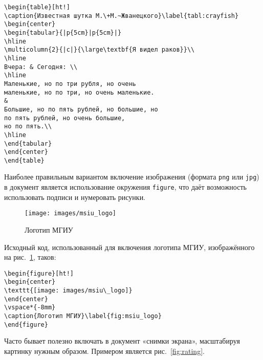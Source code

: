 \begin{small}
\begin{verbatim}
\begin{table}[ht!]
\caption{Известная шутка М.\+М.~Жванецкого}\label{tabl:crayfish}
\begin{center}
\begin{tabular}{|p{5cm}|p{5cm}|}
\hline
\multicolumn{2}{|c|}{\large\textbf{Я видел раков}}\\
\hline
Вчера: & Сегодня: \\
\hline
Маленькие, но по три рубля, но очень
маленькие, но по три, но очень маленькие.
&
Большие, но по пять рублей, но большие, но
по пять рублей, но очень большие,
но по пять.\\
\hline
\end{tabular}
\end{center}
\end{table}
\end{verbatim}
\end{small}

Наиболее правильным вариантом включение изображения (формата \verb|png| или
\verb|jpg|)
в документ является использование окружения \verb|figure|, что
даёт возможность использовать подписи и нумеровать рисунки.

\begin{figure}[ht!]
\begin{center}
\texttt{[image: images/msiu\_logo]}
\end{center}
\vspace*{-8mm}
\caption{Логотип МГИУ}\label{fig:msiu_logo}
\end{figure}

\newpage

Исходный код, использованный для включения логотипа МГИУ,
изображённого на рис.~\ref{fig:msiu_logo}, таков:

\begin{small}
\begin{verbatim}
\begin{figure}[ht!]
\begin{center}
\texttt{[image: images/msiu\_logo]}
\end{center}
\vspace*{-8mm}
\caption{Логотип МГИУ}\label{fig:msiu_logo}
\end{figure}
\end{verbatim}
\end{small}

Часто бывает полезно включать в документ «снимки экрана», масштабируя
картинку нужным образом. Примером является рис.~\ref{fig:rating}.

